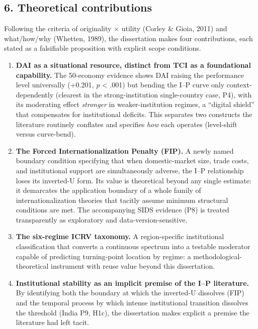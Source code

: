 \documentclass[
  a4paper,
  13pt]{extreport}
\begin{document}
\hypertarget{theoretical-contributions}{%
\subsection{6. Theoretical
contributions}\label{theoretical-contributions}}

Following the criteria of originality × utility (Corley \& Gioia, 2011)
and what/how/why (Whetten, 1989), the dissertation makes four
contributions, each stated as a falsifiable proposition with explicit
scope conditions.

\begin{enumerate}
\def\labelenumi{\arabic{enumi}.}
\item
  \textbf{DAI as a situational resource, distinct from TCI as a
  foundational capability.} The 50-economy evidence shows DAI raising
  the performance level universally (+0.201, \emph{p} \textless{} .001)
  but bending the I--P curve only context-dependently (clearest in the
  strong-institution single-country case, P4), with its moderating
  effect \emph{stronger} in weaker-institution regimes, a ``digital
  shield'' that compensates for institutional deficits. This separates
  two constructs the literature routinely conflates and specifies
  \emph{how} each operates (level-shift versus curve-bend).
\item
  \textbf{The Forced Internationalization Penalty (FIP).} A newly named
  boundary condition specifying that when domestic-market size, trade
  costs, and institutional support are simultaneously adverse, the I--P
  relationship loses its inverted-U form. Its value is theoretical
  beyond any single estimate: it demarcates the application boundary of
  a whole family of internationalization theories that tacitly assume
  minimum structural conditions are met. The accompanying SIDS evidence
  (P8) is treated transparently as exploratory and
  data-version-sensitive.
\item
  \textbf{The six-regime ICRV taxonomy.} A region-specific institutional
  classification that converts a continuous spectrum into a testable
  moderator capable of predicting turning-point location by regime: a
  methodological-theoretical instrument with reuse value beyond this
  dissertation.
\item
  \textbf{Institutional stability as an implicit premise of the I--P
  literature.} By identifying both the boundary at which the inverted-U
  dissolves (FIP) and the temporal process by which intense
  institutional transition dissolves the threshold (India P9, H1c), the
  dissertation makes explicit a premise the literature had left tacit.
\end{enumerate}
\end{document}
